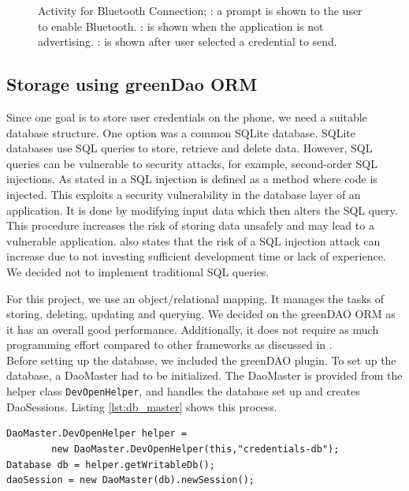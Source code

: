 \begin{figure}[H]
\caption[Activity for Bluetooth Connection]{Activity for Bluetooth Connection; \protect{}: a prompt is shown to the user to enable Bluetooth. \protect{}: is shown when the application is not advertising. \protect{}: is shown after user selected a credential to send.}
\label{fig:connectionactivity}
\end{figure}



\subsection{Storage using greenDao ORM}
Since one goal is to store user credentials on the phone, we need a suitable database structure. One option was a common SQLite database. SQLite databases use SQL queries to store, retrieve and delete data. However, SQL queries can be vulnerable to security attacks, for example, second-order SQL injections. As stated in \cite{katole2018detection} a SQL injection is defined as a method where code is injected. This exploits a security vulnerability in the database layer of an application. It is done by modifying input data which then alters the SQL query. This procedure increases the risk of storing data unsafely and may lead to a vulnerable application. \cite{katole2018detection} also states that the risk of a SQL injection attack can increase due to not investing sufficient development time or lack of experience. We decided not to implement traditional SQL queries.

For this project, we use an object/relational mapping. It manages the tasks of storing, deleting, updating and querying. We decided on the greenDAO ORM \cite{Greendao} as it has an overall good performance. Additionally, it does not require as much programming effort compared to other frameworks as discussed in \cite{pu2016understanding}. \\
Before setting up the database, we included the greenDAO plugin. To set up the database, a DaoMaster had to be initialized. The DaoMaster is provided from the helper class \texttt{DevOpenHelper}, and handles the database set up and creates DaoSessions. Listing \ref{lst:db_master} shows this process.

\begin{lstlisting}[caption=Creation of database, label=lst:db_master]
DaoMaster.DevOpenHelper helper = 
        new DaoMaster.DevOpenHelper(this,"credentials-db");
Database db = helper.getWritableDb();
daoSession = new DaoMaster(db).newSession();
\end{lstlisting}
\vspace{0.5cm}

